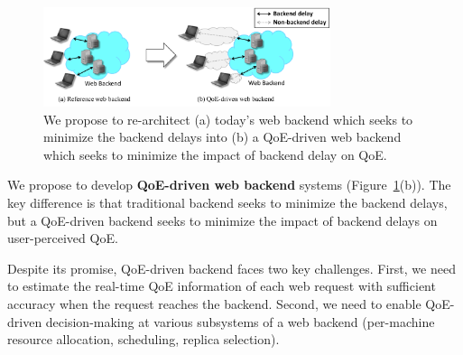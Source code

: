 \begin{figure}[t]
	\centering
	\vspace{-0.5cm}
	\hspace{0.6cm}
	\includegraphics[width=0.75\textwidth]{figs/intro-overview.pdf}
	\vspace{-0.3cm}
	\caption{We propose to re-architect (a) today's web backend which seeks to minimize the backend delays into (b) a QoE-driven web backend which seeks to minimize the impact of backend delay on QoE.}
	\label{fig:intro-overview}
\end{figure}



We propose to develop {\bf QoE-driven web backend} systems (Figure~\ref{fig:intro-overview}(b)). 
The key difference is that traditional backend seeks to minimize the backend delays, but a QoE-driven backend seeks to minimize the impact of backend delays on user-perceived QoE.

Despite its promise, QoE-driven backend faces two key challenges.
First, we need to estimate the real-time QoE information of each web request with sufficient accuracy when the request reaches the backend. 
Second, we need to enable QoE-driven decision-making at various subsystems of a web backend (\eg per-machine resource allocation, scheduling, replica selection).

